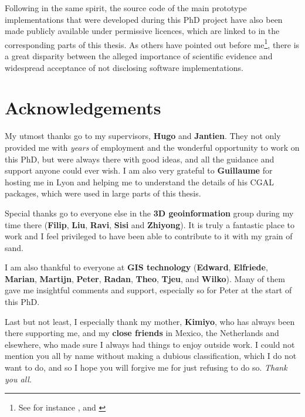 Following in the same spirit, the source code of the main prototype implementations that were developed during this PhD project have also been made publicly available under permissive licences, which are linked to in the corresponding parts of this thesis.
As others have pointed out before me\footnote{See for instance \citet{Morin12}, \citet{Joppa13} and \citet{Ince12}}, there is a great disparity between the alleged importance of scientific evidence and widespread acceptance of not disclosing software implementations.

\section*{Acknowledgements}

My utmost thanks go to my supervisors, \textbf{Hugo} and \textbf{Jantien}.
They not only provided me with \emph{years} of employment and the wonderful opportunity to work on this PhD, but were always there with good ideas, and all the guidance and support anyone could ever wish.
I am also very grateful to \textbf{Guillaume} for hosting me in Lyon and helping me to understand the details of his CGAL packages, which were used in large parts of this thesis.

Special thanks go to everyone else in the \textbf{3D geoinformation} group during my time there (\textbf{Filip}, \textbf{Liu}, \textbf{Ravi}, \textbf{Sisi} and \textbf{Zhiyong}).
It is truly a fantastic place to work and I feel privileged to have been able to contribute to it with my grain of sand.

I am also thankful to everyone at \textbf{GIS technology} (\textbf{Edward}, \textbf{Elfriede}, \textbf{Marian}, \textbf{Martijn}, \textbf{Peter}, \textbf{Radan}, \textbf{Theo}, \textbf{Tjeu}, and \textbf{Wilko}).
Many of them gave me insightful comments and support, especially so for Peter at the start of this PhD.

Last but not least, I especially thank my mother, \textbf{Kimiyo}, who has always been there supporting me, and my \textbf{close friends} in Mexico, the Netherlands and elsewhere, who made sure I always had things to enjoy outside work.
I could not mention you all by name without making a dubious classification, which I do not want to do, and so I hope you will forgive me for just refusing to do so.
\emph{Thank you all}.